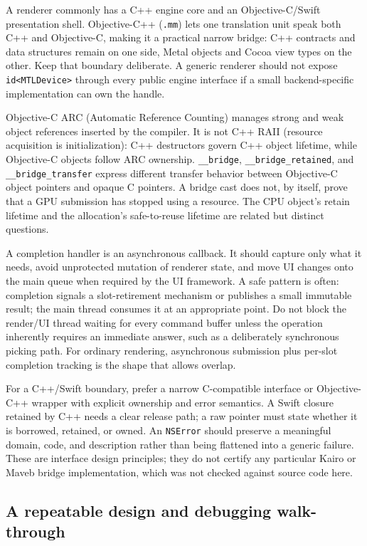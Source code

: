A renderer commonly has a C++ engine core and an Objective-C/Swift presentation shell. Objective-C++ (\texttt{.mm}) lets one translation unit speak both C++ and Objective-C, making it a practical narrow bridge: C++ contracts and data structures remain on one side, Metal objects and Cocoa view types on the other. Keep that boundary deliberate. A generic renderer should not expose \texttt{id\textless{}MTLDevice\textgreater{}} through every public engine interface if a small backend-specific implementation can own the handle.

Objective-C ARC (Automatic Reference Counting) manages strong and weak object references inserted by the compiler. It is not C++ RAII (resource acquisition is initialization): C++ destructors govern C++ object lifetime, while Objective-C objects follow ARC ownership. \texttt{\_\_bridge}, \texttt{\_\_bridge\_retained}, and \texttt{\_\_bridge\_transfer} express different transfer behavior between Objective-C object pointers and opaque C pointers. A bridge cast does not, by itself, prove that a GPU submission has stopped using a resource. The CPU object's retain lifetime and the allocation's safe-to-reuse lifetime are related but distinct questions.

A completion handler is an asynchronous callback. It should capture only what it needs, avoid unprotected mutation of renderer state, and move UI changes onto the main queue when required by the UI framework. A safe pattern is often: completion signals a slot-retirement mechanism or publishes a small immutable result; the main thread consumes it at an appropriate point. Do not block the render/UI thread waiting for every command buffer unless the operation inherently requires an immediate answer, such as a deliberately synchronous picking path. For ordinary rendering, asynchronous submission plus per-slot completion tracking is the shape that allows overlap.

For a C++/Swift boundary, prefer a narrow C-compatible interface or Objective-C++ wrapper with explicit ownership and error semantics. A Swift closure retained by C++ needs a clear release path; a raw pointer must state whether it is borrowed, retained, or owned. An \texttt{NSError} should preserve a meaningful domain, code, and description rather than being flattened into a generic failure. These are interface design principles; they do not certify any particular Kairo or Maveb bridge implementation, which was not checked against source code here.

\subsection{A repeatable design and debugging walk-through}\label{05-engine-i-ch019-a-repeatable-design-and-debugging-walk-through}

